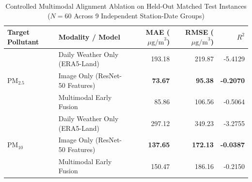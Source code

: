 \begin{table}[t]
\caption{Controlled Multimodal Alignment Ablation on Held-Out Matched Test Instances ($N=60$ Across 9 Independent Station-Date Groups)}
\label{tab:negative_result_ablation}
\centering
\small
\begin{tabular}{llrrr}
\toprule
\textbf{Target Pollutant} & \textbf{Modality / Model} & \textbf{MAE ($\mu\text{g/m}^3$)} & \textbf{RMSE ($\mu\text{g/m}^3$)} & \textbf{$R^2$} \\
\midrule
\multirow{3}{*}{$\text{PM}_{2.5}$} 
& Daily Weather Only (ERA5-Land) & 193.18 & 219.87 & -5.4129 \\
& Image Only (ResNet-50 Features) & \textbf{73.67} & \textbf{95.38} & \textbf{-0.2070} \\
& Multimodal Early Fusion & 85.86 & 106.56 & -0.5064 \\
\midrule
\multirow{3}{*}{$\text{PM}_{10}$} 
& Daily Weather Only (ERA5-Land) & 297.12 & 349.23 & -3.2755 \\
& Image Only (ResNet-50 Features) & \textbf{137.65} & \textbf{172.13} & \textbf{-0.0387} \\
& Multimodal Early Fusion & 150.47 & 186.16 & -0.2150 \\
\bottomrule
\end{tabular}
\end{table}
